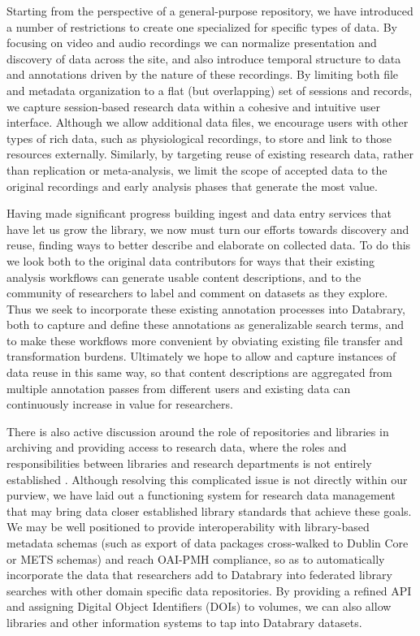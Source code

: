 \documentclass{sig-alternate}
\begin{document}
Starting from the perspective of a general-purpose repository, we have introduced a number of  restrictions to create one specialized for specific types of data.
By focusing on video and audio recordings we can normalize presentation and discovery of data across the site, and also introduce temporal structure to data and annotations driven by the nature of these recordings.
By limiting both file and metadata organization to a flat (but overlapping) set of sessions and records, we capture session-based research data within a cohesive and intuitive user interface.
Although we allow additional data files, we encourage users with other types of rich data, such as physiological recordings, to store and link to those resources externally.
Similarly, by targeting reuse of existing research data, rather than replication or meta-analysis, we limit the scope of accepted data to the original recordings and early analysis phases that generate the most value.

Having made significant progress building ingest and data entry services that have let us grow the library, we now must turn our efforts towards discovery and reuse, finding ways to better describe and elaborate on collected data.
To do this we look both to the original data contributors for ways that their existing analysis workflows can generate usable content descriptions, and to the community of researchers to label and comment on datasets as they explore.
Thus we seek to incorporate these existing annotation processes into Databrary, both to capture and define these annotations as generalizable search terms, and to make these workflows more convenient by obviating existing file transfer and transformation burdens.
Ultimately we hope to allow and capture instances of data reuse in this same way, so that content descriptions are aggregated from multiple annotation passes from different users and existing data can continuously increase in value for researchers.

There is also active discussion around the role of repositories and libraries in archiving and providing access to research data, where the roles and responsibilities between libraries and research departments is not entirely established \cite{Castelli_etal_2013, Nielson_Hjørland_2014, Macmillan_2014, Pinfield_etal_2014}.
Although resolving this complicated issue is not directly within our purview, we have laid out a functioning system for research data management that may bring data closer established library standards that achieve these goals.
We may be well positioned to provide interoperability with library-based metadata schemas (such as export of data packages cross-walked to Dublin Core or METS schemas) and reach OAI-PMH compliance, so as to automatically incorporate the data that researchers add to Databrary into federated library searches with other domain specific data repositories.
By providing a refined API and assigning Digital Object Identifiers (DOIs) to volumes, we can also allow libraries and other information systems to tap into Databrary datasets.
\end{document}
